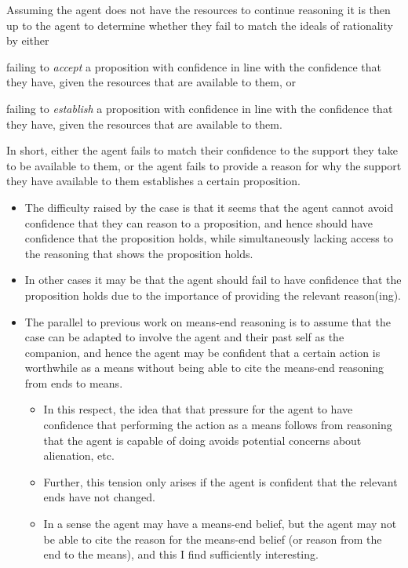\documentclass[10pt]{article}
\begin{document}
Assuming the agent does not have the resources to continue reasoning it is then up to the agent to determine whether they fail to match the ideals of rationality by either
\begin{enumerate*}[label=(\alph*)]
\item failing to \emph{accept} a proposition with confidence in line with the confidence that they have, given the resources that are available to them, or
\item failing to \emph{establish} a proposition with confidence in line with the confidence that they have, given the resources that are available to them.
\end{enumerate*}

In short, either the agent fails to match their confidence to the support they take to be available to them, or the agent fails to provide a reason for why the support they have available to them establishes a certain proposition.

\begin{itemize}
\item The difficulty raised by the case is that it seems that the agent cannot avoid confidence that they can reason to a proposition, and hence should have confidence that the proposition holds, while simultaneously lacking access to the reasoning that shows the proposition holds.
\item In other cases it may be that the agent should fail to have confidence that the proposition holds due to the importance of providing the relevant reason(ing).
\end{itemize}

\begin{itemize}
\item The parallel to previous work on means-end reasoning is to assume that the case can be adapted to involve the agent and their past self as the companion, and hence the agent may be confident that a certain action is worthwhile as a means without being able to cite the means-end reasoning from ends to means.
  \begin{itemize}
  \item In this respect, the idea that that pressure for the agent to have confidence that performing the action as a means follows from reasoning that the agent is capable of doing avoids potential concerns about alienation, etc.
  \item Further, this tension only arises if the agent is confident that the relevant ends have not changed.
  \item In a sense the agent may have a means-end belief, but the agent may not be able to cite the reason for the means-end belief (or reason from the end to the means), and this I find sufficiently interesting.
  \end{itemize}
\end{itemize}
\end{document}

